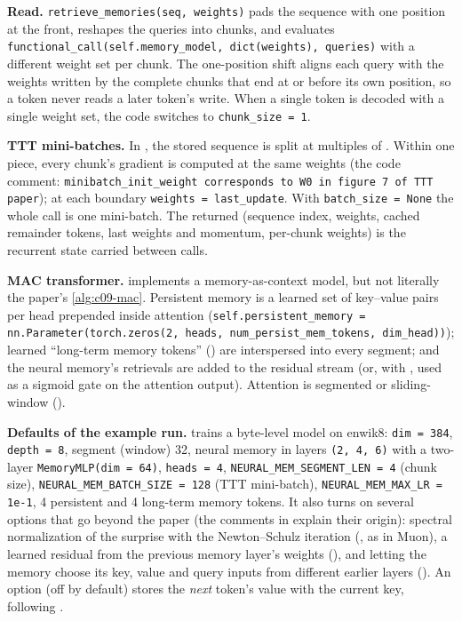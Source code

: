 \begin{implnote}[title={In the code: reading, mini-batches and the MAC transformer}]
\textbf{Read.} \texttt{retrieve\_memories(seq, weights)} pads the sequence with one position at
the front, reshapes the queries into chunks, and evaluates
\texttt{functional\_call(self.memory\_model, dict(weights), queries)} with a different weight set
per chunk. The one-position shift aligns each query with the weights written by the complete
chunks that end at or before its own position, so a token never reads a later token's write. When a single token is decoded with a single weight set, the code switches to
\texttt{chunk\_size = 1}.

\textbf{TTT mini-batches.} In , the stored sequence is split at multiples of
. Within one piece, every chunk's gradient is computed at the same weights
(the code comment: \texttt{minibatch\_init\_weight corresponds to W0 in figure 7 of TTT paper});
at each boundary \texttt{weights = last\_update}. With \texttt{batch\_size = None} the whole call is
one mini-batch. The returned  (sequence index, weights, cached remainder
tokens, last weights and momentum, per-chunk weights) is the recurrent state carried between
calls.

\textbf{MAC transformer.}  implements a
memory-as-context model, but not literally the paper's \cref{alg:c09-mac}. Persistent memory is
a learned set of key--value pairs per head prepended inside attention
(\texttt{self.persistent\_memory = nn.Parameter(torch.zeros(2, heads, num\_persist\_mem\_tokens, dim\_head))});
learned ``long-term memory tokens'' () are interspersed into every
segment; and the neural memory's retrievals are added to the residual stream (or, with
, used as a sigmoid gate on the attention output).
Attention is segmented or sliding-window ().

\textbf{Defaults of the example run.}  trains a byte-level model on
enwik8: \texttt{dim = 384}, \texttt{depth = 8}, segment (window) 32, neural memory in layers
\texttt{(2, 4, 6)} with a two-layer \texttt{MemoryMLP(dim = 64)}, \texttt{heads = 4},
\texttt{NEURAL\_MEM\_SEGMENT\_LEN = 4} (chunk size), \texttt{NEURAL\_MEM\_BATCH\_SIZE = 128} (TTT
mini-batch), \texttt{NEURAL\_MEM\_MAX\_LR = 1e-1}, 4 persistent and 4 long-term memory tokens.
It also turns on several options that go beyond the paper (the comments in 
explain their origin):
spectral normalization of the surprise with the Newton--Schulz iteration (,
as in Muon), a learned residual from the previous memory layer's weights
(), and letting the memory choose its key, value and query
inputs from different earlier layers (). An option
 (off by default) stores the \emph{next} token's value with
the current key, following \citet{c09-zhao2026fwpkm}.
\end{implnote}

